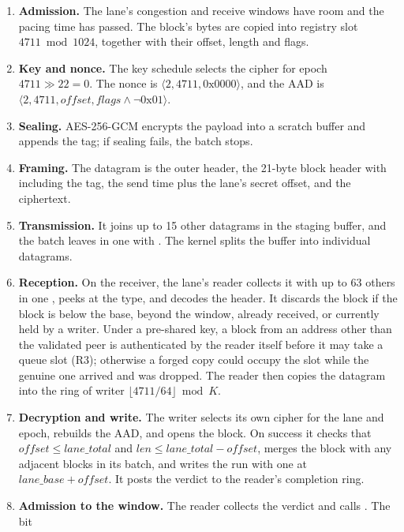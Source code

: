 \begin{enumerate}
  \item \textbf{Admission.} The lane's congestion and receive windows have room and the pacing time has passed.
    The block's bytes are copied into registry slot $4711 \bmod 1024$, together with their offset, length and
    flags.
  \item \textbf{Key and nonce.} The key schedule selects the cipher for epoch $4711\gg22=0$. The nonce is
    $\langle 2, 4711, \text{0x0000}\rangle$, and the AAD is $\langle 2, 4711, \mathit{offset}, \mathit{flags}
    \wedge\lnot\text{0x01}\rangle$.
  \item \textbf{Sealing.} AES-256-GCM encrypts the payload into a scratch buffer and appends the tag; if sealing
    fails, the batch stops.
  \item \textbf{Framing.} The datagram is the outer header, the 21-byte block header with
     including the tag, the send time plus the lane's secret offset, and the ciphertext.
  \item \textbf{Transmission.} It joins up to 15 other datagrams in the staging buffer, and the batch leaves in
    one  with . The kernel splits the buffer into individual datagrams.
  \item \textbf{Reception.} On the receiver, the lane's reader collects it with up to 63 others in one
    , peeks at the type, and decodes the header. It discards the block if the block is below the
    base, beyond the window, already received, or currently held by a writer. Under a pre-shared key, a block
    from an address other than the validated peer is authenticated by the reader itself before it may take a
    queue slot (R3); otherwise a forged copy could occupy the slot while the genuine one arrived and was dropped.
    The reader then copies the datagram into the ring of writer $\lfloor4711/64\rfloor\bmod K$.
  \item \textbf{Decryption and write.} The writer selects its own cipher for the lane and epoch, rebuilds the
    AAD, and opens the block. On success it checks that
    $\mathit{offset}\le\mathit{lane\_total}$ and $\mathit{len}\le\mathit{lane\_total}-\mathit{offset}$, merges
    the block with any adjacent blocks in its batch, and writes the run with one  at
    $\mathit{lane\_base}+\mathit{offset}$. It posts the verdict to the reader's completion ring.
  \item \textbf{Admission to the window.} The reader collects the verdict and calls . The bit

\end{enumerate}
